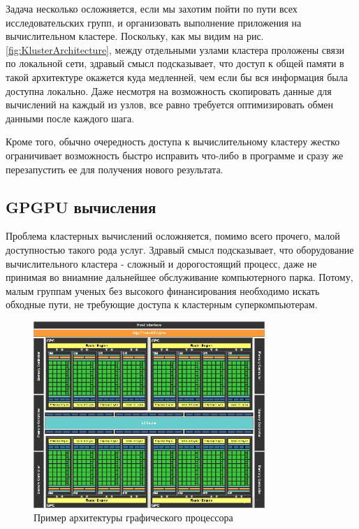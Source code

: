         Задача несколько осложняется, если мы захотим пойти по пути всех исследовательских групп, и организовать выполнение приложения на вычислительном кластере. Поскольку, как мы видим на рис. \ref{fig:KlusterArchitecture}, между отдельными узлами кластера проложены связи по локальной сети, здравый смысл подсказывает, что доступ к общей памяти в такой архитектуре окажется куда медленней, чем если бы вся информация была доступна локально. Даже несмотря на возможность скопировать данные для вычислений на каждый из узлов, все равно требуется оптимизировать обмен данными после каждого шага.

        Кроме того, обычно очередность доступа к вычислительному кластеру жестко ограничивает возможность быстро исправить что-либо в программе и сразу же перезапустить ее для получения нового результата.

    \subsection{GPGPU вычисления} %
    \label{sub:gpgpu}
        Проблема кластерных вычислений осложняется, помимо всего прочего, малой доступностью такого рода услуг. Здравый смысл подсказывает, что оборудование вычислительного кластера - сложный и дорогостоящий процесс, даже не принимая во вниамние дальнейшее обслуживание компьютерного парка. Потому, малым группам ученых без высокого финансирования необходимо искать обходные пути, не требующие доступа к кластерным суперкомпьютерам.

        \begin{figure}[h]
        \centering
            \includegraphics[height=200pt]{Images/GPU-diagramm}
            \caption{Пример архитектуры графического процессора}
            \label{fig:gpuArchitecture}
        \end{figure}

